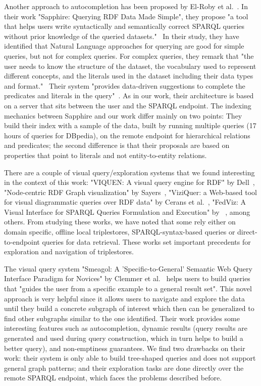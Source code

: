 Another approach to autocompletion has been proposed by El-Roby et al.~\cite{El-Roby2016}. 
In their work "Sapphire: Querying RDF Data Made Simple", they propose "a tool that helps users write syntactically and semantically correct SPARQL queries without prior knowledge of the queried datasets."~\cite{El-Roby2016}
In their study, they have identified that Natural Language approaches for querying are good for simple queries, but not for complex queries. 
For complex queries, they remark that "the user needs to know the structure of the dataset, the vocabulary used to represent different concepts, and the literals used in the dataset including their data types and format."~\cite{El-Roby2016}
Their system "provides data-driven suggestions to complete the predicates and literals in the query"~\cite{El-Roby2016}. 
As in our work, their architecture is based on a server that sits between the user and the SPARQL endpoint.
The indexing mechanics between Sapphire and our work differ mainly on two points: 
They build their index with a sample of the data, built by running multiple queries (17 hours of queries for DBpedia), on the remote endpoint for hierarchical relations and predicates; 
the second difference is that their proposals are based on properties that point to literals and not entity-to-entity relations.

There are a couple of visual query/exploration systems that we found interesting in the context of this work: "VIQUEN: A visual query engine for RDF" by Dell~\cite{Dell2010}, "Node-centric RDF Graph visualization" by Sayers~\cite{Sayers2004}, "ViziQuer: a Web-based tool for visual diagrammatic queries over RDF data" by Cerans et al.~\cite{Cerans2018}, "FedViz: A Visual Interface for SPARQL Queries Formulation and Execution" by ~\cite{Zainab2015}, among others. From studying these works, we have noted that some rely either on domain specific, offline local triplestores, SPARQL-syntax-based queries or direct-to-endpoint queries for data retrieval. These works set important precedents for exploration and navigation of triplestores.

The visual query system "Smeagol: A 'Specific-to-General' Semantic Web Query Interface Paradigm for Novices" by Clemmer et al.~\cite{Clemmer2011} helps users to build queries that "guides the user from a specific example to a general result set". This novel approach is very helpful since it allows users to navigate and explore the data until they build a concrete subgraph of interest which then can be generalized to find other subgraphs similar to the one identified. Their work provides some interesting features such as autocompletion, dynamic results (query results are generated and used during query construction, which in turn helps to build a better query), and non-emptiness guarantees. We find two drawbacks on their work: their system is only able to build tree-shaped queries and does not support general graph patterns; and their exploration tasks are done directly over the remote SPARQL endpoint, which faces the problems described before.

